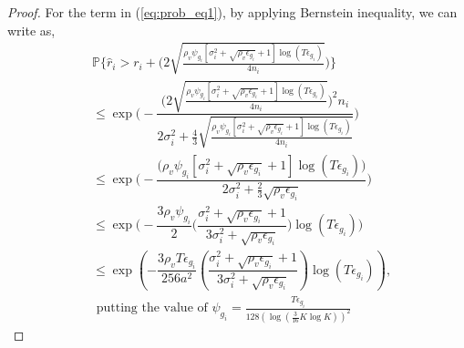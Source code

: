 \begin{proof}
For the term in (\ref{eq:prob_eq1}), by applying Bernstein inequality, we can write as,
\begin{align*}
&\mathbb{P}\bigg\lbrace \hat{r}_{i}> r_{i} + \bigg(2\sqrt{\frac{\rho_v\psi_{g_i} [\sigma_{i}^{2}+\sqrt{\rho_{v}\epsilon_{g_{i}}} + 1]\log( T\epsilon_{g_{i}})}{4n_{i}}  } \bigg)\bigg\rbrace\\
&\leq \exp\bigg(- \dfrac{\bigg(2\sqrt{\frac{\rho_v\psi_{g_i} [\sigma_{i}^{2}+\sqrt{\rho_{v}\epsilon_{g_{i}}} +1]\log( T\epsilon_{g_{i}})}{4n_{i}}}\bigg)^{2}n_{i}}{2\sigma_{i}^{2}+\frac{4}{3}\sqrt{\frac{\rho_v\psi_{g_i} [\sigma_{i}^{2}+\sqrt{\rho_{v}\epsilon_{g_{i}}}+1]\log( T\epsilon_{g_{i}})}{4n_{i}}}}\bigg) \\
&\leq \exp\bigg(- \dfrac{\bigg(\rho_v\psi_{g_i} [\sigma_{i}^{2}+\sqrt{\rho_{v}\epsilon_{g_{i}}} + 1]\log( T\epsilon_{g_{i}})\bigg)}{2\sigma_{i}^{2}+\frac{2}{3}\sqrt{\rho_v \epsilon_{g_{i}}}} \bigg)\\
&\leq \exp\bigg(- \dfrac{3\rho_v\psi_{g_i}}{2} \bigg(\dfrac{\sigma_{i}^{2}+\sqrt{\rho_{v}\epsilon_{g_{i}}}+1}{3\sigma_{i}^{2}+\sqrt{\rho_v \epsilon_{g_{i}}}}\bigg) \log( T\epsilon_{g_{i}}) \bigg)\\
&\leq \exp\left(- \dfrac{3\rho_v T\epsilon_{g_i}}{256 a^2} \left(\dfrac{\sigma_{i}^{2}+\sqrt{\rho_{v}\epsilon_{g_{i}}}+1}{3\sigma_{i}^{2}+\sqrt{\rho_v \epsilon_{g_{i}}}}\right) \log( T\epsilon_{g_{i}}) \right),\\
&\text{ putting the value of $\psi_{g_i}=\frac{T\epsilon_{g_i}}{128(\log(\frac{3}{16} K\log K))^{2}}$}

\end{align*}
\end{proof}
